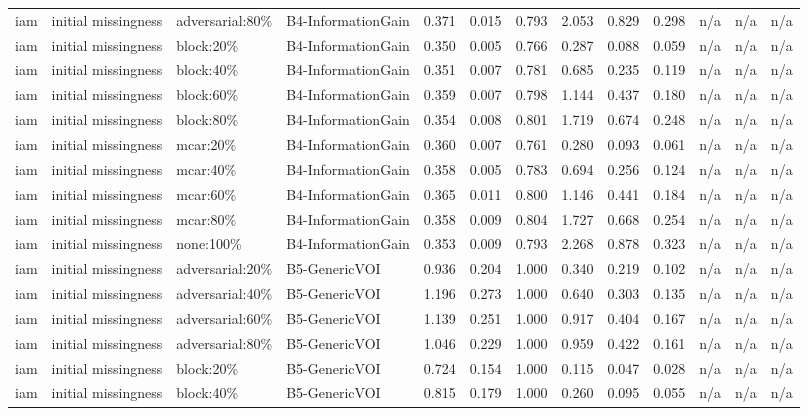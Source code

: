\begin{table}[!ht]
{\begin{tabular}{lllllllllllll}
iam & initial missingness & adversarial:80\% & B4-InformationGain & 0.371 & 0.015 & 0.793 & 2.053 & 0.829 & 0.298 & n/a & n/a & n/a \\
iam & initial missingness & block:20\% & B4-InformationGain & 0.350 & 0.005 & 0.766 & 0.287 & 0.088 & 0.059 & n/a & n/a & n/a \\
iam & initial missingness & block:40\% & B4-InformationGain & 0.351 & 0.007 & 0.781 & 0.685 & 0.235 & 0.119 & n/a & n/a & n/a \\
iam & initial missingness & block:60\% & B4-InformationGain & 0.359 & 0.007 & 0.798 & 1.144 & 0.437 & 0.180 & n/a & n/a & n/a \\
iam & initial missingness & block:80\% & B4-InformationGain & 0.354 & 0.008 & 0.801 & 1.719 & 0.674 & 0.248 & n/a & n/a & n/a \\
iam & initial missingness & mcar:20\% & B4-InformationGain & 0.360 & 0.007 & 0.761 & 0.280 & 0.093 & 0.061 & n/a & n/a & n/a \\
iam & initial missingness & mcar:40\% & B4-InformationGain & 0.358 & 0.005 & 0.783 & 0.694 & 0.256 & 0.124 & n/a & n/a & n/a \\
iam & initial missingness & mcar:60\% & B4-InformationGain & 0.365 & 0.011 & 0.800 & 1.146 & 0.441 & 0.184 & n/a & n/a & n/a \\
iam & initial missingness & mcar:80\% & B4-InformationGain & 0.358 & 0.009 & 0.804 & 1.727 & 0.668 & 0.254 & n/a & n/a & n/a \\
iam & initial missingness & none:100\% & B4-InformationGain & 0.353 & 0.009 & 0.793 & 2.268 & 0.878 & 0.323 & n/a & n/a & n/a \\
iam & initial missingness & adversarial:20\% & B5-GenericVOI & 0.936 & 0.204 & 1.000 & 0.340 & 0.219 & 0.102 & n/a & n/a & n/a \\
iam & initial missingness & adversarial:40\% & B5-GenericVOI & 1.196 & 0.273 & 1.000 & 0.640 & 0.303 & 0.135 & n/a & n/a & n/a \\
iam & initial missingness & adversarial:60\% & B5-GenericVOI & 1.139 & 0.251 & 1.000 & 0.917 & 0.404 & 0.167 & n/a & n/a & n/a \\
iam & initial missingness & adversarial:80\% & B5-GenericVOI & 1.046 & 0.229 & 1.000 & 0.959 & 0.422 & 0.161 & n/a & n/a & n/a \\
iam & initial missingness & block:20\% & B5-GenericVOI & 0.724 & 0.154 & 1.000 & 0.115 & 0.047 & 0.028 & n/a & n/a & n/a \\
iam & initial missingness & block:40\% & B5-GenericVOI & 0.815 & 0.179 & 1.000 & 0.260 & 0.095 & 0.055 & n/a & n/a & n/a \\

\end{tabular}}
\end{table}
